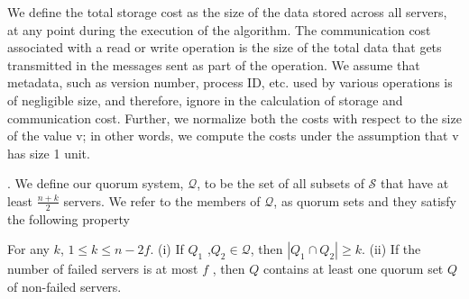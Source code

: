 We define the total storage cost as the size of the
data stored across all servers, at any point during the execution of the algorithm. The
communication cost associated with a read or write operation is the size of the total data that
gets transmitted in the messages sent as part of the operation. We assume that metadata,
such as version number, process ID, etc. used by various operations is of negligible size, and therefore,  ignore in the calculation of storage and communication cost. Further, we normalize
both the costs with respect to the size of the value v; in other words, we compute the costs
under the assumption that v has size 1 unit.

 
. We define our quorum system, $\mathcal{Q}$, to be
the set of all subsets of $\mathcal{S}$  that have at least $\frac{n+k}{2}$ servers. 
 We refer to the members of $\mathcal{Q}$, as quorum
sets and they satisfy the following
property

\begin{lemma}
For any $k$,  $1 \leq k \leq n -2f$. (i) If $Q_1$ ,$Q_2 \in \mathcal{Q}$,
then $|Q_1 \cap Q_2 | \geq k$. (ii) If the number of failed servers is
at most $f$ , then $Q$ contains at least one quorum set $Q$ of
non-failed servers.
\end{lemma}

